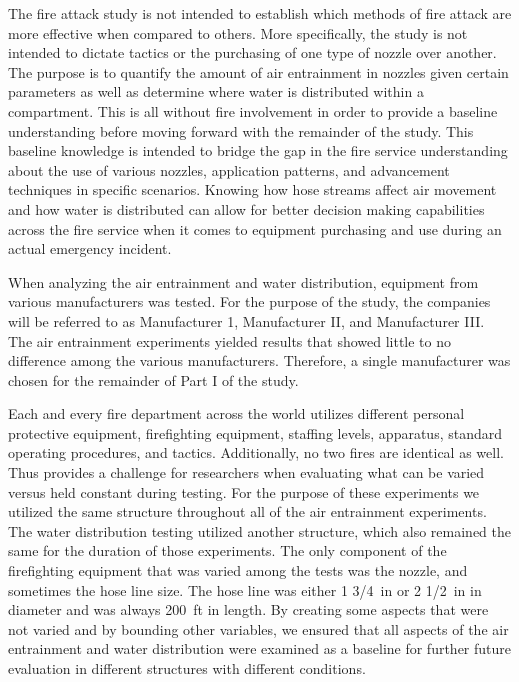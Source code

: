 \documentclass{article}
\begin{document}
The fire attack study is not intended to establish which methods of fire attack are more effective when compared to others. More specifically, the study is not intended to dictate tactics or the purchasing of one type of nozzle over another. The purpose is to quantify the amount of air entrainment in nozzles given certain parameters as well as determine where water is distributed within a compartment. This is all without fire involvement in order to provide a baseline understanding before moving forward with the remainder of the study. This baseline knowledge is intended to bridge the gap in the fire service understanding about the use of various nozzles, application patterns, and advancement techniques in specific scenarios. Knowing how hose streams affect air movement and how water is distributed can allow for better decision making capabilities across the fire service when it comes to equipment purchasing and use during an actual emergency incident.

When analyzing the air entrainment and water distribution, equipment from various manufacturers was tested. For the purpose of the study, the companies will be referred to as Manufacturer 1, Manufacturer II, and Manufacturer III. The air entrainment experiments yielded results that showed little to no difference among the various manufacturers. Therefore, a single manufacturer was chosen for the remainder of Part I of the study.

Each and every fire department across the world utilizes different personal protective equipment, firefighting equipment, staffing levels, apparatus, standard operating procedures, and tactics. Additionally, no two fires are identical as well. Thus provides a challenge for researchers when evaluating what can be varied versus held constant during testing. For the purpose of these experiments we utilized the same structure throughout all of the air entrainment experiments. The water distribution testing utilized another structure, which also remained the same for the duration of those experiments. The only component of the firefighting equipment that was varied among the tests was the nozzle, and sometimes the hose line size. The hose line was either 1 3/4~in or 2 1/2~in in diameter and was always 200~ft in length. By creating some aspects that were not varied and by bounding other variables, we ensured that all aspects of the air entrainment and water distribution were examined as a baseline for further future evaluation in different structures with different conditions.
\end{document}
